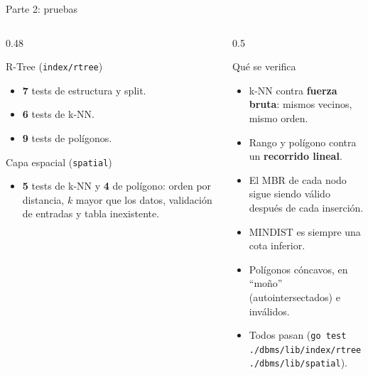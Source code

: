 \documentclass[aspectratio=169,10pt]{beamer}
\begin{document}
\begin{frame}{Parte 2: pruebas}
  \begin{columns}[T]
    \begin{column}{0.48\textwidth}
      \begin{exampleblock}{R-Tree (\texttt{index/rtree})}
        \small
        \begin{itemize}
          \item \textbf{7} tests de estructura y split.
          \item \textbf{6} tests de k-NN.
          \item \textbf{9} tests de polígonos.
        \end{itemize}
      \end{exampleblock}
      \begin{exampleblock}{Capa espacial (\texttt{spatial})}
        \small
        \begin{itemize}
          \item \textbf{5} tests de k-NN y \textbf{4} de polígono: orden por distancia, $k$ mayor que los datos, validación de entradas y tabla inexistente.
        \end{itemize}
      \end{exampleblock}
    \end{column}
    \begin{column}{0.5\textwidth}
      \begin{block}{Qué se verifica}
        \small
        \begin{itemize}
          \item k-NN contra \textbf{fuerza bruta}: mismos vecinos, mismo orden.
          \item Rango y polígono contra un \textbf{recorrido lineal}.
          \item El MBR de cada nodo sigue siendo válido después de cada inserción.
          \item MINDIST es siempre una cota inferior.
          \item Polígonos cóncavos, en ``moño'' (autointersectados) e inválidos.
          \item Todos pasan (\texttt{go test ./dbms/lib/index/rtree ./dbms/lib/spatial}).
        \end{itemize}
      \end{block}
    \end{column}
  \end{columns}
\end{frame}

\end{document}
